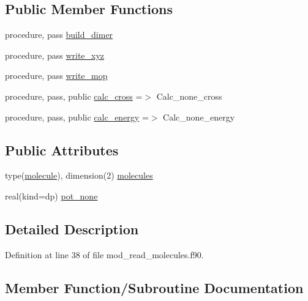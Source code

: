 \subsection*{Public Member Functions}
\begin{DoxyCompactItemize}
\item 
procedure, pass \hyperlink{structmod__read__molecules_1_1dimer_add40d724da30ec05ed3672149f9bbd73}{build\+\_\+dimer}
\item 
procedure, pass \hyperlink{structmod__read__molecules_1_1dimer_a1fc93d5f2dd7c4f7004678086d0fb83c}{write\+\_\+xyz}
\item 
procedure, pass \hyperlink{structmod__read__molecules_1_1dimer_a7cbfba60cf017b7070b177de9d313ef7}{write\+\_\+mop}
\item 
procedure, pass, public \hyperlink{structmod__read__molecules_1_1dimer_ac68d610d7189a3e9306fc74d3c12afa3}{calc\+\_\+cross} =$>$ Calc\+\_\+none\+\_\+cross
\item 
procedure, pass, public \hyperlink{structmod__read__molecules_1_1dimer_a6fb49cd36be96c4e3ce6ebac70e2db74}{calc\+\_\+energy} =$>$ Calc\+\_\+none\+\_\+energy
\end{DoxyCompactItemize}
\subsection*{Public Attributes}
\begin{DoxyCompactItemize}
\item 
type(\hyperlink{structmod__read__molecules_1_1molecule}{molecule}), dimension(2) \hyperlink{structmod__read__molecules_1_1dimer_a53f974dd96f74ff3b97bcc1511209333}{molecules}
\item 
real(kind=dp) \hyperlink{structmod__read__molecules_1_1dimer_aa70cdc483b2f8c3c9b505d32c5915fd2}{pot\+\_\+none}
\end{DoxyCompactItemize}


\subsection{Detailed Description}


Definition at line 38 of file mod\+\_\+read\+\_\+molecules.\+f90.



\subsection{Member Function/\+Subroutine Documentation}
\mbox{\label{structmod__read__molecules_1_1dimer_add40d724da30ec05ed3672149f9bbd73}} 
